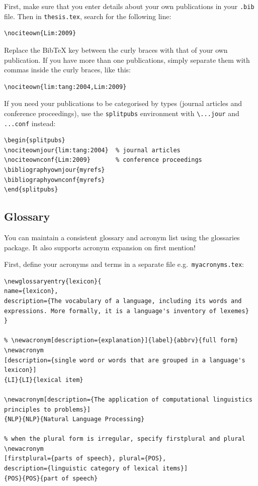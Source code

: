 First, make sure that you enter details about your own publications in your \verb|.bib| file.  Then in \verb|thesis.tex|, search for the following line:

\begin{lstlisting}
\nociteown{Lim:2009}
\end{lstlisting}

Replace the BibTeX key between the curly braces with that of your own publication.  If you have more than one publications, simply separate them with commas inside the curly braces, like this:

\begin{lstlisting}
\nociteown{lim:tang:2004,Lim:2009}
\end{lstlisting}

If you need your publications to be categorised by types (journal articles and conference proceedings), use the \texttt{splitpubs} environment with \verb=\...jour= and \verb=...conf= instead:

\begin{lstlisting}[keepspaces=true,moretexcs={\nociteownjour,\nociteownconf,\bibliographyownjour,\bibliographyownconf},emph={splitpubs},emphstyle={\bfseries}]
\begin{splitpubs}
\nociteownjour{lim:tang:2004}  % journal articles
\nociteownconf{Lim:2009}       % conference proceedings
\bibliographyownjour{myrefs}
\bibliographyownconf{myrefs}
\end{splitpubs}
\end{lstlisting}


\subsection{Glossary}\label{sec:glossary}
You can maintain a consistent glossary and acronym list using the \textsf{glossaries} package. It also supports acronym expansion on first mention!

First, define your acronyms and terms in a separate file e.g.~\texttt{myacronyms.tex}:


\begin{lstlisting}[moretexcs={newacronym,newglossaryentry},
emph={name,description,plural,firstplural},emphstyle=\bfseries]
% \newglossaryentry{label}{name={term},description={explanation}}
\newglossaryentry{lexicon}{
name={lexicon},
description={The vocabulary of a language, including its words and expressions. More formally, it is a language's inventory of lexemes}
}

% \newacronym[description={explanation}]{label}{abbrv}{full form}
\newacronym
[description={single word or words that are grouped in a language's lexicon}]
{LI}{LI}{lexical item}

\newacronym[description={The application of computational linguistics principles to problems}]
{NLP}{NLP}{Natural Language Processing}

% when the plural form is irregular, specify firstplural and plural
\newacronym
[firstplural={parts of speech}, plural={POS},
description={linguistic category of lexical items}]
{POS}{POS}{part of speech}
\end{lstlisting}


